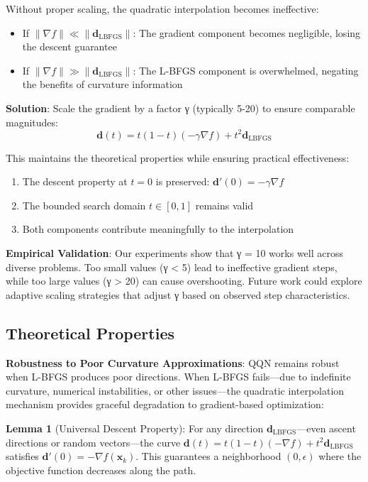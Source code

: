 Without proper scaling, the quadratic interpolation becomes ineffective:

\begin{itemize}
\tightlist
\item
  If \(\|\nabla f\| \ll \|\mathbf{d}_{\text{LBFGS}}\|\): The gradient component becomes negligible, losing the descent guarantee
\item
  If \(\|\nabla f\| \gg \|\mathbf{d}_{\text{LBFGS}}\|\): The L-BFGS component is overwhelmed, negating the benefits of curvature information
\end{itemize}

\textbf{Solution}: Scale the gradient by a factor γ (typically 5-20) to ensure comparable magnitudes:
\[\mathbf{d}(t) = t(1-t)(-\gamma \nabla f) + t^2 \mathbf{d}_{\text{LBFGS}}\]

This maintains the theoretical properties while ensuring practical effectiveness:

\begin{enumerate}
\def\labelenumi{\arabic{enumi}.}
\tightlist
\item
  The descent property at \(t=0\) is preserved: \(\mathbf{d}'(0) = -\gamma \nabla f\)
\item
  The bounded search domain \(t \in [0,1]\) remains valid
\item
  Both components contribute meaningfully to the interpolation
\end{enumerate}

\textbf{Empirical Validation}: Our experiments show that γ = 10 works well across diverse problems. Too small values (γ \textless{} 5) lead to ineffective gradient steps, while too large values (γ \textgreater{} 20) can cause overshooting. Future work could explore adaptive scaling strategies that adjust γ based on observed step characteristics.

\hypertarget{theoretical-properties}{%
\subsection{Theoretical Properties}\label{theoretical-properties}}

\textbf{Robustness to Poor Curvature Approximations}: QQN remains robust when L-BFGS produces poor directions.
When L-BFGS fails---due to indefinite curvature, numerical instabilities, or other issues---the quadratic interpolation mechanism provides graceful degradation to gradient-based optimization:

\textbf{Lemma 1} (Universal Descent Property): For any direction \(\mathbf{d}_{\text{LBFGS}}\)---even ascent directions or random vectors---the curve \(\mathbf{d}(t) = t(1-t)(-\nabla f) + t^2 \mathbf{d}_{\text{LBFGS}}\) satisfies \(\mathbf{d}'(0) = -\nabla f(\mathbf{x}_k)\). This guarantees a neighborhood \((0, \epsilon)\) where the objective function decreases along the path.

